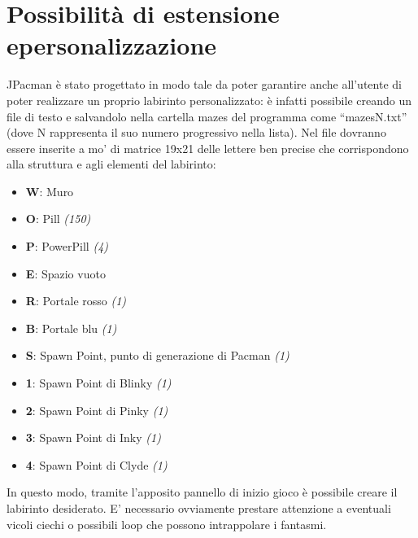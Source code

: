 \documentclass[12pt,a4paper]{report}
\begin{document}



\chapter{Possibilità di estensione e\newline personalizzazione}\label{ch:est-pers}

JPacman è stato progettato in modo tale da poter garantire anche all’utente di poter realizzare un proprio labirinto personalizzato: è infatti possibile creando un file di testo e salvandolo nella cartella mazes del programma come “mazesN.txt” (dove N rappresenta il suo numero progressivo nella lista). Nel file dovranno essere inserite a mo’ di matrice 19x21 delle lettere ben precise che corrispondono alla struttura e agli elementi del labirinto:
\begin{itemize}
 \item \textbf{W}: Muro
 \item \textbf{O}: Pill \textit{(150)}
 \item \textbf{P}: PowerPill \textit{(4)}
 \item \textbf{E}: Spazio vuoto
 \item \textbf{R}: Portale rosso \textit{(1)}
 \item \textbf{B}: Portale blu \textit{(1)}
 \item \textbf{S}: Spawn Point, punto di generazione di Pacman \textit{(1)}
 \item \textbf{1}: Spawn Point di Blinky \textit{(1)}
 \item \textbf{2}: Spawn Point di Pinky \textit{(1)}
 \item \textbf{3}: Spawn Point di Inky \textit{(1)}
 \item \textbf{4}: Spawn Point di Clyde \textit{(1)}
\end{itemize}
In questo modo, tramite l’apposito pannello di inizio gioco è possibile creare il labirinto desiderato. E’ necessario ovviamente prestare attenzione a eventuali vicoli ciechi o possibili loop che possono intrappolare i fantasmi. 
\end{document}
